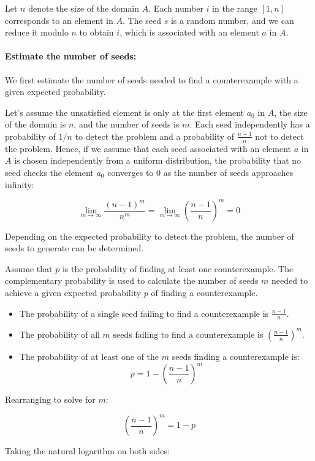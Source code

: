 \documentclass[runningheads]{llncs}
\begin{document}
Let \( n \) denote the size of the domain \( A \). Each number \( i \) in the range \([1, n]\) corresponds to an element in \( A \). The seed \( s \) is a random number, and we can reduce it modulo \( n \) to obtain \( i \), which is associated with an element \( a \) in \( A \).

\paragraph{Estimate the number of seeds:} We first estimate the number of seeds needed to find a counterexample with a given expected probability. 

Let's assume the unsatisfied element is only at the first element $a_0$ in $A$, the size of the domain is $n$, and the number of seeds is $m$. Each seed independently has a probability of $1/n$ to detect the problem and a probability of $\frac{n-1}{n}$ not to detect the problem. Hence, if we assume that each seed associated with an element $a$ in $A$ is chosen independently from a uniform distribution, the probability that no seed checks the element $a_0$ converges to $0$ as the number of seeds approaches infinity:

\[
  \lim_{m \to \infty} \frac{(n-1)^m}{n^m} = \lim_{m \to \infty} \left( \frac{n-1}{n} \right)^m = 0
\]

Depending on the expected probability to detect the problem, the number of seeds to generate can be determined. 

Assume that $p$ is the probability of finding at least one counterexample. The complementary probability is used to calculate the number of seeds $m$ needed to achieve a given expected probability $p$ of finding a counterexample.
\begin{itemize}
\item The probability of a single seed failing to find a counterexample is $\frac{n-1}{n}$.
\item The probability of all $m$ seeds failing to find a counterexample is $\left(\frac{n-1}{n}\right)^m$.
\item The probability of at least one of the $m$ seeds finding a counterexample is:
\[
p = 1 - \left(\frac{n-1}{n}\right)^m
\]
\end{itemize}  

Rearranging to solve for \( m \):

\[
\left(\frac{n-1}{n}\right)^m = 1 - p
\]

Taking the natural logarithm on both sides:
\end{document}
